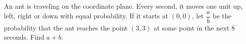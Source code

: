 An ant is traveling on the coordinate plane. Every second, it moves one unit up, left, right or down with equal probability. If it starts at $(0,0)$, let $\dfrac{a}{b}$ be the probability that the ant reaches the point $(3,3)$ at some point in the next $8$ seconds. Find $a+b$.
